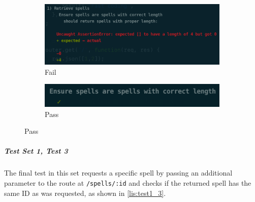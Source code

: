 \begin{figure}[h]
\caption{Test output for test set 1, test 2}
\label{fig:test1_2}
	\centering
	\begin{subfigure}[b]{0.5\textwidth}
		\centering
		\includegraphics[width=\textwidth]{images/12_fail}
		\caption{Fail}
		\label{fig:test12_fail}
	\end{subfigure}
	\hfill
	\begin{subfigure}[b]{0.5\textwidth}
		\centering
		\includegraphics[width=\textwidth]{images/12_pass}
		\caption{Pass}
		\label{fig:test12_pass}
	\end{subfigure}
\end{figure}


\subparagraph{Test Set 1, Test 3} The final test in this set requests a specific spell by passing an additional parameter to the route at \texttt{/spells/:id} and checks if the returned spell has the same ID as was requested, as shown in \autoref{lis:test1_3}.

